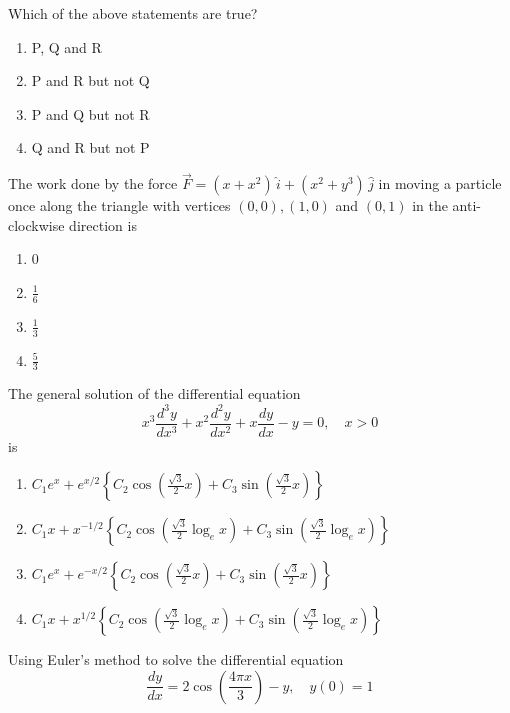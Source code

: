     Which of the above statements are true?
    \begin{multicols}{2}
    \begin{enumerate}
        \item P, Q and R
        \item P and R but not Q
        \item P and Q but not R
        \item Q and R but not P
    \end{enumerate}
    \end{multicols}
\bigskip
    \item The work done by the force \( \vec{F} = (x + x^2) \, \hat{i} + (x^2 + y^3) \, \hat{j} \) in moving a particle once along the triangle with vertices \( (0,0), (1,0) \) and \( (0,1) \) in the anti-clockwise direction is
    \begin{multicols}{4}
    \begin{enumerate}
        \item 0
        \item \( \frac{1}{6} \)
        \item \( \frac{1}{3} \)
        \item \( \frac{5}{3} \)
    \end{enumerate}
    \end{multicols} 
\bigskip   
    \item The general solution of the differential equation
    \[
    x^3 \frac{d^3 y}{dx^3} + x^2 \frac{d^2 y}{dx^2} + x \frac{dy}{dx} - y = 0, \quad x > 0
    \]
    is
    \begin{enumerate}
        \item \( C_1 e^x + e^{x/2} \left\{ C_2 \cos\left( \frac{\sqrt{3}}{2} x \right) + C_3 \sin\left( \frac{\sqrt{3}}{2} x \right) \right\} \)
        \item \( C_1 x + x^{-1/2} \left\{ C_2 \cos\left( \frac{\sqrt{3}}{2} \log_e x \right) + C_3 \sin\left( \frac{\sqrt{3}}{2} \log_e x \right) \right\} \)
        \item \( C_1 e^x + e^{-x/2} \left\{ C_2 \cos\left( \frac{\sqrt{3}}{2} x \right) + C_3 \sin\left( \frac{\sqrt{3}}{2} x \right) \right\} \)
        \item \( C_1 x + x^{1/2} \left\{ C_2 \cos\left( \frac{\sqrt{3}}{2} \log_e x \right) + C_3 \sin\left( \frac{\sqrt{3}}{2} \log_e x \right) \right\} \)
    \end{enumerate}
\bigskip
    \item Using Euler's method to solve the differential equation
    \[
    \frac{dy}{dx} = 2 \cos \left( \frac{4 \pi x}{3} \right) - y, \quad y(0) = 1
    \]
